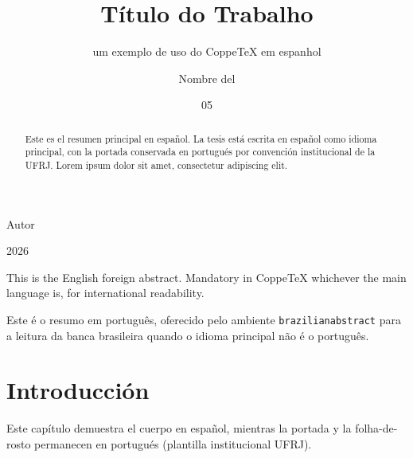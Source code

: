 \documentclass[spanish,dsc]{ufrj}
\begin{document}
  \title{Título do Trabalho}
  \subtitle{um exemplo de uso do CoppeTeX em espanhol}
  \author{Nombre del}{Autor}
  \date{05}{2026}
  \maketitle
  \frontmatter
  \begin{abstract}
    Este es el resumen principal en español. La tesis está escrita
    en español como idioma principal, con la portada conservada en
    portugués por convención institucional de la UFRJ. Lorem ipsum
    dolor sit amet, consectetur adipiscing elit.
  \end{abstract}
  \begin{foreignabstract}
    This is the English foreign abstract. Mandatory in CoppeTeX whichever
    the main language is, for international readability.
  \end{foreignabstract}
  \begin{brazilianabstract}
    Este é o resumo em português, oferecido pelo ambiente
    \texttt{brazilianabstract} para a leitura da banca brasileira quando o
    idioma principal não é o português.
  \end{brazilianabstract}
  \tableofcontents
  \mainmatter
  \chapter{Introducción}
  Este capítulo demuestra el cuerpo en español, mientras la portada
  y la folha-de-rosto permanecen en portugués (plantilla institucional
  UFRJ).
\end{document}
